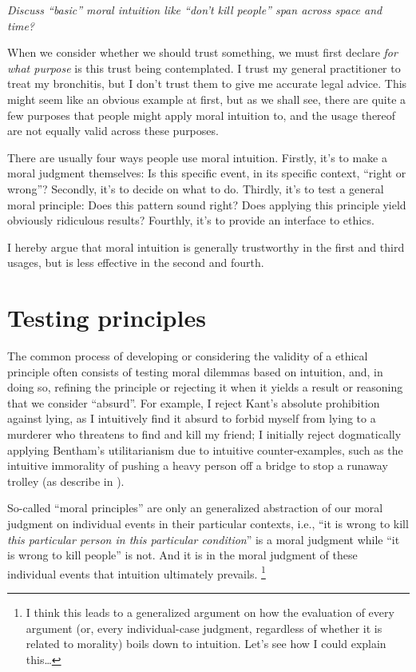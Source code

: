 \documentclass{scrartcl}
\begin{document}
\emph{Discuss ``basic'' moral intuition like ``don't kill people'' span
across space and time?}

When we consider whether we should trust something, we must first
declare \emph{for what purpose} is this trust being contemplated. I
trust my general practitioner to treat my bronchitis, but I don't trust
them to give me accurate legal advice. This might seem like an obvious
example at first, but as we shall see, there are quite a few purposes
that people might apply moral intuition to, and the usage thereof are
not equally valid across these purposes.

There are usually four ways people use moral intuition. Firstly, it's to
make a moral judgment themselves: Is this specific event, in its
specific context, ``right or wrong''? Secondly, it's to decide on what
to do. Thirdly, it's to test a general moral principle: Does this
pattern sound right? Does applying this principle yield obviously
ridiculous results? Fourthly, it's to provide an interface to ethics.

I hereby argue that moral intuition is generally trustworthy in the
first and third usages, but is less effective in the second and fourth.

\section{Testing principles}

The common process of developing or considering the validity of a
ethical principle often consists of testing moral dilemmas based on
intuition, and, in doing so, refining the principle or rejecting it when
it yields a result or reasoning that we consider ``absurd''. For
example, I reject Kant's absolute prohibition against lying, as I
intuitively find it absurd to forbid myself from lying to a murderer who
threatens to find and kill my friend; I initially reject dogmatically
applying Bentham's utilitarianism due to intuitive counter-examples,
such as the intuitive immorality of pushing a heavy person off a bridge
to stop a runaway trolley (as describe in \autocite[21]{justice}).

So-called ``moral principles'' are only an generalized abstraction of
our moral judgment on individual events in their particular contexts,
i.e., ``it is wrong to kill \emph{this particular person in this
particular condition}'' is a moral judgment while ``it is wrong to kill
people'' is not. And it is in the moral judgment of these individual
events that intuition ultimately prevails. \footnote{I think this leads
  to a generalized argument on how the evaluation of every argument (or,
  every individual-case judgment, regardless of whether it is related to
  morality) boils down to intuition. Let's see how I could explain
  this\ldots{}}
\end{document}
